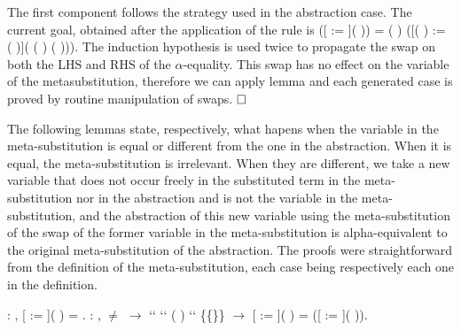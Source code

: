 \begin{coqdoccode}
\end{coqdoccode}
The first component follows the strategy used in the abstraction case. The current goal, obtained after the application of the rule  is    ([ := ](   )) =
    (   ) ([(   ) := (   )]( (   )  (   ))). The induction hypothesis is used twice to propagate the swap on both the LHS and RHS of the $\alpha$-equality. This swap has no effect on the variable of the metasubstitution, therefore we can apply lemma  and each generated case is proved by routine manipulation of swaps. $\hfill\Box$
\begin{coqdoccode}
\coqdocemptyline
\coqdocemptyline
\end{coqdoccode}
The following lemmas state, respectively, what hapens when the variable in the meta-substitution is equal or different from the one in the abstraction. When it is equal, the meta-substitution is irrelevant. When they are different, we take a new variable that does not occur freely in the substituted term in the meta-substitution nor in the abstraction and is not the variable in the meta-substitution, and the abstraction of this new variable using the meta-substitution of the swap of the former variable in the meta-substitution is alpha-equivalent to the original meta-substitution of the abstraction. The proofs were straightforward from the definition of the meta-substitution, each case being respectively each one in the definition. \newline
\begin{coqdoccode}
\coqdocnoindent
{}  : \coqdockw{\ensuremath{\forall}}   , [ := ](  ) =   .\coqdoceol
\coqdocemptyline
\coqdocnoindent
{}  : \coqdockw{\ensuremath{\forall}}     ,  \ensuremath{\not=}  \ensuremath{\rightarrow}  ``   ``  (  ) `` \{\{\}\} \ensuremath{\rightarrow} [ := ](  ) =   ([ := ](   )).\coqdoceol
\coqdocemptyline
\coqdocemptyline
\end{coqdoccode}
